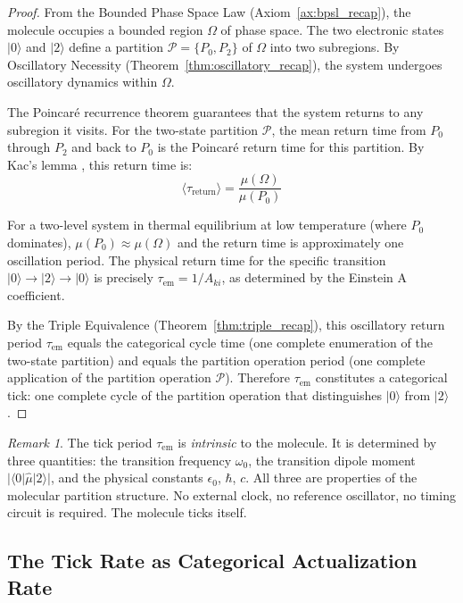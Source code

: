 \documentclass[11pt,twocolumn,a4paper]{article}
\theoremstyle{definition}
\theoremstyle{remark}
\newtheorem{remark}[theorem]{Remark}
\newcommand{\tem}{\tau_{\mathrm{em}}}
\newcommand{\Aki}{A_{ki}}
\begin{document}
\begin{proof}
From the Bounded Phase Space Law (Axiom~\ref{ax:bpsl_recap}), the molecule occupies a bounded region $\Omega$ of phase space. The two electronic states $|0\rangle$ and $|2\rangle$ define a partition $\mathcal{P} = \{P_0, P_2\}$ of $\Omega$ into two subregions. By Oscillatory Necessity (Theorem~\ref{thm:oscillatory_recap}), the system undergoes oscillatory dynamics within $\Omega$.

The Poincar\'{e} recurrence theorem \citep{poincare1890} guarantees that the system returns to any subregion it visits. For the two-state partition $\mathcal{P}$, the mean return time from $P_0$ through $P_2$ and back to $P_0$ is the Poincar\'{e} return time for this partition. By Kac's lemma \citep{kac1947}, this return time is:
\begin{equation}
\langle \tau_{\mathrm{return}} \rangle = \frac{\mu(\Omega)}{\mu(P_0)}
\end{equation}

For a two-level system in thermal equilibrium at low temperature (where $P_0$ dominates), $\mu(P_0) \approx \mu(\Omega)$ and the return time is approximately one oscillation period. The physical return time for the specific transition $|0\rangle \to |2\rangle \to |0\rangle$ is precisely $\tem = 1/\Aki$, as determined by the Einstein A coefficient.

By the Triple Equivalence (Theorem~\ref{thm:triple_recap}), this oscillatory return period $\tem$ equals the categorical cycle time (one complete enumeration of the two-state partition) and equals the partition operation period (one complete application of the partition operation $\mathcal{P}$). Therefore $\tem$ constitutes a categorical tick: one complete cycle of the partition operation that distinguishes $|0\rangle$ from $|2\rangle$.
\end{proof}

\begin{remark}
The tick period $\tem$ is \emph{intrinsic} to the molecule. It is determined by three quantities: the transition frequency $\omega_0$, the transition dipole moment $|\langle 0 | \hat{\mu} | 2 \rangle|$, and the physical constants $\epsilon_0$, $\hbar$, $c$. All three are properties of the molecular partition structure. No external clock, no reference oscillator, no timing circuit is required. The molecule ticks itself.
\end{remark}

\subsection{The Tick Rate as Categorical Actualization Rate}
\end{document}
